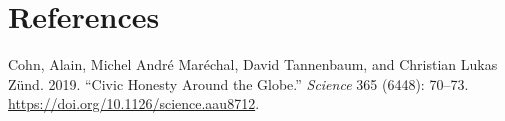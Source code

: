 \documentclass[12pt,halfline,a4paper,]{ouparticle}
\begin{document}
\hypertarget{references}{%
\section*{References}\label{references}}

\hypertarget{refs}{}
\leavevmode\hypertarget{ref-cohnCivicHonestyGlobe2019}{}%
Cohn, Alain, Michel André Maréchal, David Tannenbaum, and Christian
Lukas Zünd. 2019. ``Civic Honesty Around the Globe.'' \emph{Science} 365
(6448): 70--73. \url{https://doi.org/10.1126/science.aau8712}.
\end{document}
